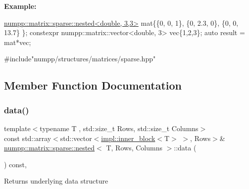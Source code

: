 {\bfseries Example\+:} 
\begin{DoxyCode}
\hyperlink{classnumpp_1_1matrix_1_1sparse_1_1nested}{numpp::matrix::sparse::nested<double, 3,3>} mat\{\{0,  0,   1\},
                                                \{0,  2.3, 0\},
                                                \{0,  0,   13.7\}
                                               \};
constexpr numpp::matrix::vector<double, 3> vec\{1,2,3\};
\textcolor{keyword}{auto} result = mat*vec;
\end{DoxyCode}



\begin{DoxyCode}
\textcolor{preprocessor}{#include"numpp/structures/matrices/sparse.hpp"}
\end{DoxyCode}
 

\subsection{Member Function Documentation}
\mbox{\label{classnumpp_1_1matrix_1_1sparse_1_1nested_a56a31c654f21e001e6e4cc4aa7055ee1}} 
\subsubsection{\texorpdfstring{data()}{data()}\hspace{0.1cm}{\footnotesize\ttfamily [1/2]}}
{\footnotesize\ttfamily template$<$typename T , std\+::size\+\_\+t Rows, std\+::size\+\_\+t Columns$>$ \\
const std\+::array$<$std\+::vector$<$\hyperlink{structnumpp_1_1matrix_1_1sparse_1_1impl_1_1inner__block}{impl\+::inner\+\_\+block}$<$T$>$ $>$, Rows$>$\& \hyperlink{classnumpp_1_1matrix_1_1sparse_1_1nested}{numpp\+::matrix\+::sparse\+::nested}$<$ T, Rows, Columns $>$\+::data (\begin{DoxyParamCaption}{ }\end{DoxyParamCaption}) const\hspace{0.3cm}{\ttfamily [inline]}, {\ttfamily [noexcept]}}

Returns underlying data structure \mbox{\label{classnumpp_1_1matrix_1_1sparse_1_1nested_a1201f9550dded2b187221ccf768a88f3}} 
